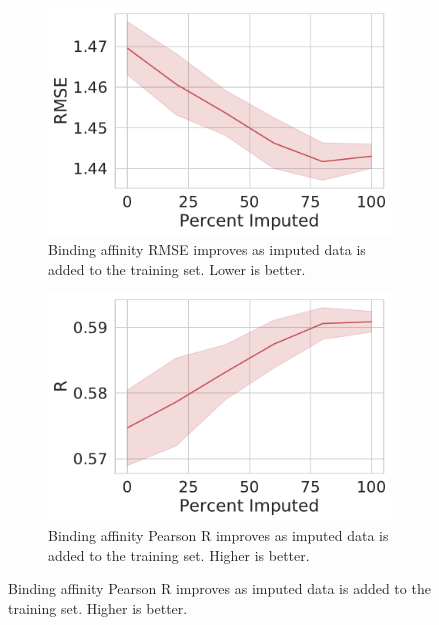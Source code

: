 \documentclass[journal=jmcmar,manuscript=article]{achemso}
\begin{document}
\begin{figure}[tbph]
    \centering
    \begin{subfigure}[t]{0.48\textwidth}
        \centering
        \includegraphics[width=\linewidth]{figures/MedGOEns_addingImpRMSE.pdf}
        \caption{Binding affinity RMSE improves as imputed data is added to the training set. Lower is better.}
    \end{subfigure}
    \hfill
    \begin{subfigure}[t]{0.48\textwidth}
        \centering
        \includegraphics[width=\linewidth]{figures/MedGOEns_addingImpR.pdf}
        \caption{Binding affinity Pearson R improves as imputed data is added to the training set. Higher is better.}
    \end{subfigure}


\end{figure}
\end{document}
